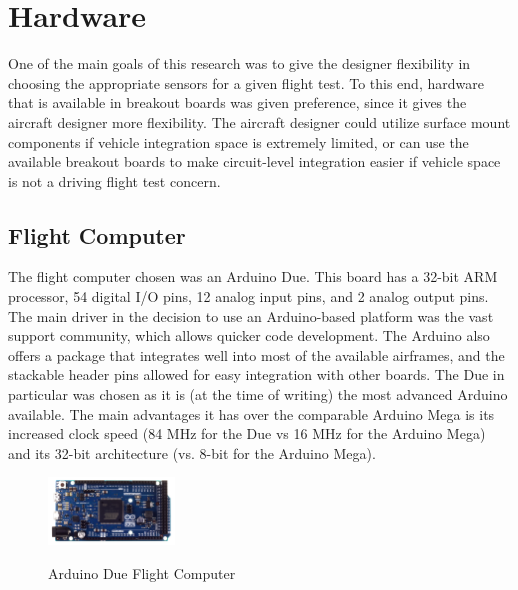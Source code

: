 \chapter{Hardware}
\label{hardware}
One of the main goals of this research was to give the designer flexibility in choosing the appropriate sensors for a given flight test. To this end, hardware that is available in breakout boards was given preference, since it gives the aircraft designer more flexibility. The aircraft designer could utilize surface mount components if vehicle integration space is extremely limited, or can use the available breakout boards to make circuit-level integration easier if vehicle space is not a driving flight test concern.
\section{Flight Computer}
The flight computer chosen was an Arduino Due. This board has a 32-bit ARM processor, 54 digital I/O pins, 12 analog input pins, and 2 analog output pins. The main driver in the decision to use an Arduino-based platform was the vast support community, which allows quicker code development. The Arduino also offers a package that integrates well into most of the available airframes, and the stackable header pins allowed for easy integration with other boards. The Due in particular was chosen as it is (at the time of writing) the most advanced Arduino available. The main advantages it has over the comparable Arduino Mega is its increased clock speed (84 MHz for the Due\cite{Atmel2012} vs 16 MHz for the Arduino Mega\cite{Atmel2012atmega}) and its 32-bit architecture (vs. 8-bit for the Arduino Mega).
\begin{figure}[H]

  \centering
    \includegraphics[width=0.3\textwidth]{figures/arduinoDue.jpg}\  \caption{Arduino Due Flight Computer} \label{arduinoPicture}
\end{figure}

